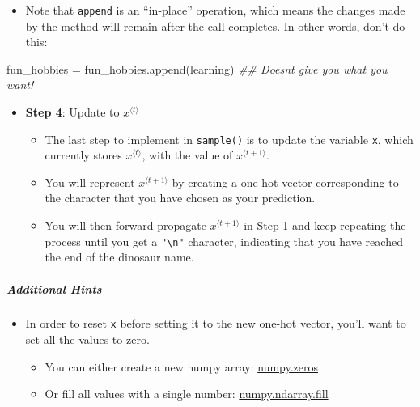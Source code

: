 \documentclass[11pt]{article}
\providecommand{\tightlist}{%
      \setlength{\itemsep}{0pt}\setlength{\parskip}{0pt}}
\newenvironment{Shaded}{}{}
\newcommand{\StringTok}[1]{\textcolor[rgb]{0.25,0.44,0.63}{{#1}}}
\newcommand{\CommentTok}[1]{\textcolor[rgb]{0.38,0.63,0.69}{\textit{{#1}}}}
\newcommand{\NormalTok}[1]{{#1}}
\newcommand{\OperatorTok}[1]{\textcolor[rgb]{0.40,0.40,0.40}{{#1}}}
\begin{document}
\begin{itemize}
\tightlist
\item
  Note that \texttt{append} is an ``in-place'' operation, which means
  the changes made by the method will remain after the call completes.
  In other words, don't do this:
\end{itemize}

\begin{Shaded}
\begin{Highlighting}[]
\NormalTok{fun\_hobbies }\OperatorTok{=}\NormalTok{ fun\_hobbies.append(}\StringTok{\textquotesingle{}learning\textquotesingle{}}\NormalTok{)  }\CommentTok{\#\# Doesn\textquotesingle{}t give you what you want!}
\end{Highlighting}
\end{Shaded}

    \begin{itemize}
\tightlist
\item
  \textbf{Step 4}: Update to \(x^{\langle t \rangle }\)

  \begin{itemize}
  \tightlist
  \item
    The last step to implement in \texttt{sample()} is to update the
    variable \texttt{x}, which currently stores
    \(x^{\langle t \rangle }\), with the value of
    \(x^{\langle t + 1 \rangle }\).
  \item
    You will represent \(x^{\langle t + 1 \rangle }\) by creating a
    one-hot vector corresponding to the character that you have chosen
    as your prediction.
  \item
    You will then forward propagate \(x^{\langle t + 1 \rangle }\) in
    Step 1 and keep repeating the process until you get a
    \texttt{"\textbackslash{}n"} character, indicating that you have
    reached the end of the dinosaur name.
  \end{itemize}
\end{itemize}

    \hypertarget{additional-hints}{%
\subparagraph{Additional Hints}\label{additional-hints}}

\begin{itemize}
\tightlist
\item
  In order to reset \texttt{x} before setting it to the new one-hot
  vector, you'll want to set all the values to zero.

  \begin{itemize}
  \tightlist
  \item
    You can either create a new numpy array:
    \href{https://docs.scipy.org/doc/numpy/reference/generated/numpy.zeros.html}{numpy.zeros}
  \item
    Or fill all values with a single number:
    \href{https://docs.scipy.org/doc/numpy/reference/generated/numpy.ndarray.fill.html}{numpy.ndarray.fill}
  \end{itemize}
\end{itemize}
\end{document}
